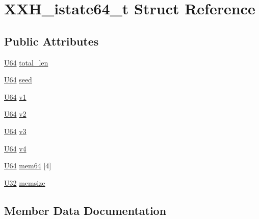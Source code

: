 \hypertarget{struct_x_x_h__istate64__t}{}\section{X\+X\+H\+\_\+istate64\+\_\+t Struct Reference}
\label{struct_x_x_h__istate64__t}
\subsection*{Public Attributes}
\begin{DoxyCompactItemize}
\item 
\hyperlink{xxhash_8c_a24c386d3758eba951eb7532fdbb45804}{U64} \hyperlink{struct_x_x_h__istate64__t_af12b1222f841660bef64efaae2a6a5a6}{total\+\_\+len}
\item 
\hyperlink{xxhash_8c_a24c386d3758eba951eb7532fdbb45804}{U64} \hyperlink{struct_x_x_h__istate64__t_a78dc60197be1a16bf99a15a85ce6e34c}{seed}
\item 
\hyperlink{xxhash_8c_a24c386d3758eba951eb7532fdbb45804}{U64} \hyperlink{struct_x_x_h__istate64__t_a5bdd6967a8d80194d4e55b2f61431b8f}{v1}
\item 
\hyperlink{xxhash_8c_a24c386d3758eba951eb7532fdbb45804}{U64} \hyperlink{struct_x_x_h__istate64__t_a8e14247869d90a1eea79cd99c0b06029}{v2}
\item 
\hyperlink{xxhash_8c_a24c386d3758eba951eb7532fdbb45804}{U64} \hyperlink{struct_x_x_h__istate64__t_a714d26f89359d5b897e3e8ffa97b946d}{v3}
\item 
\hyperlink{xxhash_8c_a24c386d3758eba951eb7532fdbb45804}{U64} \hyperlink{struct_x_x_h__istate64__t_aeb3e5e9f7d5ce61021dca87fae23df27}{v4}
\item 
\hyperlink{xxhash_8c_a24c386d3758eba951eb7532fdbb45804}{U64} \hyperlink{struct_x_x_h__istate64__t_afb9b66e9fbc5d3f51ffd0eafb869f544}{mem64} \mbox{[}4\mbox{]}
\item 
\hyperlink{xxhash_8c_ac3df7cf3c8cb172a588adec881447d68}{U32} \hyperlink{struct_x_x_h__istate64__t_af785fbcec8f01e664482baea8f0be464}{memsize}
\end{DoxyCompactItemize}


\subsection{Member Data Documentation}
\hypertarget{struct_x_x_h__istate64__t_afb9b66e9fbc5d3f51ffd0eafb869f544}{}
